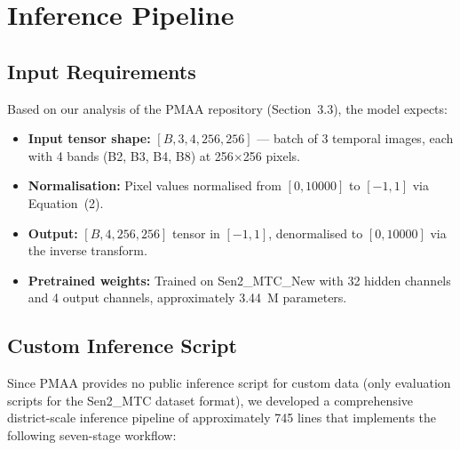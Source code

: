 \documentclass[12pt,a4paper]{article}
\begin{document}

\section{Inference Pipeline}

\subsection{Input Requirements}

Based on our analysis of the PMAA repository (Section~3.3), the model expects:

\begin{itemize}[leftmargin=2em]
    \item \textbf{Input tensor shape:} $[B, 3, 4, 256, 256]$ --- batch of 3 temporal images, each with 4 bands (B2, B3, B4, B8) at 256$\times$256 pixels.
    \item \textbf{Normalisation:} Pixel values normalised from $[0, 10000]$ to $[-1, 1]$ via Equation~(2).
    \item \textbf{Output:} $[B, 4, 256, 256]$ tensor in $[-1, 1]$, denormalised to $[0, 10000]$ via the inverse transform.
    \item \textbf{Pretrained weights:} Trained on Sen2\_MTC\_New with 32 hidden channels and 4 output channels, approximately 3.44~M parameters.
\end{itemize}

\subsection{Custom Inference Script}

Since PMAA provides no public inference script for custom data (only evaluation scripts for the Sen2\_MTC dataset format), we developed a comprehensive district-scale inference pipeline of approximately 745 lines that implements the following seven-stage workflow:
\end{document}
